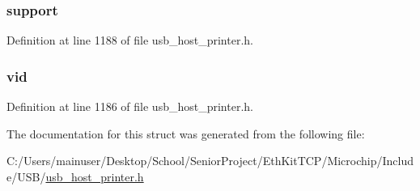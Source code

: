 \subsubsection[{support}]{ support}\label{struct___u_s_b___p_r_i_n_t_e_r___d_e_v_i_c_e___i_d_a608dd933f8c7b8e68ea8eb0d6db48cd0}


Definition at line 1188 of file usb\+\_\+host\+\_\+printer.\+h.

\hypertarget{struct___u_s_b___p_r_i_n_t_e_r___d_e_v_i_c_e___i_d_a9fcc011b7b6427b55322964f2d01781f}{}
\subsubsection[{vid}]{ vid}\label{struct___u_s_b___p_r_i_n_t_e_r___d_e_v_i_c_e___i_d_a9fcc011b7b6427b55322964f2d01781f}


Definition at line 1186 of file usb\+\_\+host\+\_\+printer.\+h.



The documentation for this struct was generated from the following file\+:\begin{DoxyCompactItemize}
\item 
C\+:/\+Users/mainuser/\+Desktop/\+School/\+Senior\+Project/\+Eth\+Kit\+T\+C\+P/\+Microchip/\+Include/\+U\+S\+B/\hyperlink{usb__host__printer_8h}{usb\+\_\+host\+\_\+printer.\+h}\end{DoxyCompactItemize}
